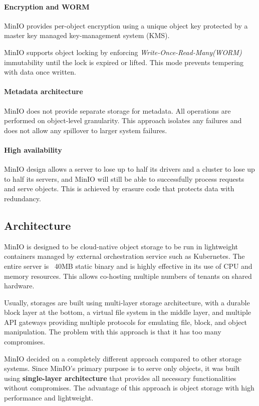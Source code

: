     \paragraph{Encryption and WORM}
    MinIO provides per-object encryption using a unique object key protected by a master key managed key-management system (KMS).

    MinIO supports object locking by enforcing \textit{Write-Once-Read-Many(WORM)} immutability until the lock is expired or lifted. This mode prevents tempering with data once written\cite{minioHighPerformance}.

    \paragraph{Metadata architecture}
    MinIO does not provide separate storage for metadata. All operations are performed on object-level granularity. This approach isolates any failures and does not allow any spillover to larger system failures\cite{minioIntel}.

    \paragraph{High availability}
    MinIO design allows a server to lose up to half its drivers and a cluster to lose up to half its servers, and MinIO will still be able to successfully process requests and serve objects. This is achieved by erasure code that protects data with redundancy\cite{minioIntel}.

    \subsection{Architecture}
    MinIO is designed to be cloud-native object storage to be run in lightweight containers managed by external orchestration service such as Kubernetes. The entire server is ~40MB static binary and is highly effective in its use of CPU and memory resources. This allows co-hosting multiple numbers of tenants on shared hardware\cite{minioObjectStorage}.

    Usually, storages are built using multi-layer storage architecture, with a durable block layer at the bottom, a virtual file system in the middle layer, and multiple API gateways providing multiple protocols for emulating file, block, and object manipulation. The problem with this approach is that it has too many compromises\cite{minioIntel}.

    MinIO decided on a completely different approach compared to other storage systems. Since MinIO's primary purpose is to serve only objects, it was built using \textbf{single-layer architecture} that provides all necessary functionalities without compromises. The advantage of this approach is object storage with high performance and lightweight\cite{minioIntel}.

